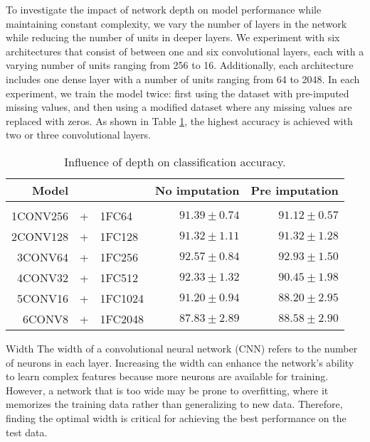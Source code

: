 To investigate the impact of network depth on model performance while maintaining constant complexity, we vary the number of layers in the network while reducing the number of units in deeper layers.
We experiment with six architectures that consist of between one and six convolutional layers, each with a varying number of units ranging from 256 to 16.
Additionally, each architecture includes one dense layer with a number of units ranging from 64 to 2048. 
In each experiment, we train the model twice: first using the dataset with pre-imputed missing values, and then using a modified dataset where any missing values are replaced with zeros.
As shown in Table \ref{tab:temCNNdepth}, the highest accuracy is achieved with two or three convolutional layers.

\begin{table}[!htbp]
  \centering
   \begin{tabular}{rclrr}
   Model&&                  & No imputation         & Pre imputation             \\[0.2cm]
   \hline \\[-0.2cm]
   1CONV256 &+& 1FC64   	 & $91.39 \pm 0.74$ 	 & $91.12 \pm 0.57$\\
   2CONV128 &+& 1FC128  	 & $91.32 \pm 1.11$ 	 & $91.32 \pm 1.28$\\
   3CONV64 &+& 1FC256   	 & $\mathbf{92.57 \pm 0.84}$ 	 & $\mathbf{92.93 \pm 1.50}$\\
   4CONV32 &+& 1FC512   	 & $92.33 \pm 1.32$ 	 & $90.45 \pm 1.98$\\
   5CONV16 &+& 1FC1024  	 & $91.20 \pm 0.94$ 	 & $88.20 \pm 2.95$\\
   6CONV8 &+& 1FC2048   	 & $87.83 \pm 2.89$ 	 & $88.58 \pm 2.90$\\
   \end{tabular}
   \caption{Influence of depth on classification accuracy.}
   \label{tab:temCNNdepth}
 \end{table}

\begin{paragraph}{Width}
The width of a convolutional neural network (CNN) refers to the number of neurons in each layer.
Increasing the width can enhance the network's ability to learn complex features because more neurons are available for training.
However, a network that is too wide may be prone to overfitting, where it memorizes the training data rather than generalizing to new data.
Therefore, finding the optimal width is critical for achieving the best performance on the test data.
\end{paragraph}

